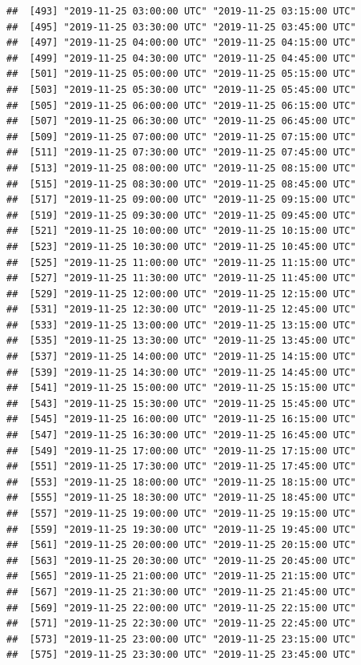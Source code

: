 \documentclass{article}\usepackage[]{graphicx}\usepackage[]{color}
\makeatletter
\newenvironment{kframe}{%
 \def\at@end@of@kframe{}%
 \ifinner\ifhmode%
  \def\at@end@of@kframe{\end{minipage}}%
  \begin{minipage}{\columnwidth}%
 \fi\fi%
 \def\FrameCommand##1{\hskip\@totalleftmargin \hskip-\fboxsep
 \colorbox{shadecolor}{##1}\hskip-\fboxsep
     \hskip-\linewidth \hskip-\@totalleftmargin \hskip\columnwidth}%
 \MakeFramed {\advance\hsize-\width
   \@totalleftmargin\z@ \linewidth\hsize
   \@setminipage}}%
 {\par\unskip\endMakeFramed%
 \at@end@of@kframe}
\newenvironment{knitrout}{}{} %
\makeatother
\begin{document}
\begin{knitrout}
\begin{kframe}
\begin{verbatim}
##  [493] "2019-11-25 03:00:00 UTC" "2019-11-25 03:15:00 UTC"
##  [495] "2019-11-25 03:30:00 UTC" "2019-11-25 03:45:00 UTC"
##  [497] "2019-11-25 04:00:00 UTC" "2019-11-25 04:15:00 UTC"
##  [499] "2019-11-25 04:30:00 UTC" "2019-11-25 04:45:00 UTC"
##  [501] "2019-11-25 05:00:00 UTC" "2019-11-25 05:15:00 UTC"
##  [503] "2019-11-25 05:30:00 UTC" "2019-11-25 05:45:00 UTC"
##  [505] "2019-11-25 06:00:00 UTC" "2019-11-25 06:15:00 UTC"
##  [507] "2019-11-25 06:30:00 UTC" "2019-11-25 06:45:00 UTC"
##  [509] "2019-11-25 07:00:00 UTC" "2019-11-25 07:15:00 UTC"
##  [511] "2019-11-25 07:30:00 UTC" "2019-11-25 07:45:00 UTC"
##  [513] "2019-11-25 08:00:00 UTC" "2019-11-25 08:15:00 UTC"
##  [515] "2019-11-25 08:30:00 UTC" "2019-11-25 08:45:00 UTC"
##  [517] "2019-11-25 09:00:00 UTC" "2019-11-25 09:15:00 UTC"
##  [519] "2019-11-25 09:30:00 UTC" "2019-11-25 09:45:00 UTC"
##  [521] "2019-11-25 10:00:00 UTC" "2019-11-25 10:15:00 UTC"
##  [523] "2019-11-25 10:30:00 UTC" "2019-11-25 10:45:00 UTC"
##  [525] "2019-11-25 11:00:00 UTC" "2019-11-25 11:15:00 UTC"
##  [527] "2019-11-25 11:30:00 UTC" "2019-11-25 11:45:00 UTC"
##  [529] "2019-11-25 12:00:00 UTC" "2019-11-25 12:15:00 UTC"
##  [531] "2019-11-25 12:30:00 UTC" "2019-11-25 12:45:00 UTC"
##  [533] "2019-11-25 13:00:00 UTC" "2019-11-25 13:15:00 UTC"
##  [535] "2019-11-25 13:30:00 UTC" "2019-11-25 13:45:00 UTC"
##  [537] "2019-11-25 14:00:00 UTC" "2019-11-25 14:15:00 UTC"
##  [539] "2019-11-25 14:30:00 UTC" "2019-11-25 14:45:00 UTC"
##  [541] "2019-11-25 15:00:00 UTC" "2019-11-25 15:15:00 UTC"
##  [543] "2019-11-25 15:30:00 UTC" "2019-11-25 15:45:00 UTC"
##  [545] "2019-11-25 16:00:00 UTC" "2019-11-25 16:15:00 UTC"
##  [547] "2019-11-25 16:30:00 UTC" "2019-11-25 16:45:00 UTC"
##  [549] "2019-11-25 17:00:00 UTC" "2019-11-25 17:15:00 UTC"
##  [551] "2019-11-25 17:30:00 UTC" "2019-11-25 17:45:00 UTC"
##  [553] "2019-11-25 18:00:00 UTC" "2019-11-25 18:15:00 UTC"
##  [555] "2019-11-25 18:30:00 UTC" "2019-11-25 18:45:00 UTC"
##  [557] "2019-11-25 19:00:00 UTC" "2019-11-25 19:15:00 UTC"
##  [559] "2019-11-25 19:30:00 UTC" "2019-11-25 19:45:00 UTC"
##  [561] "2019-11-25 20:00:00 UTC" "2019-11-25 20:15:00 UTC"
##  [563] "2019-11-25 20:30:00 UTC" "2019-11-25 20:45:00 UTC"
##  [565] "2019-11-25 21:00:00 UTC" "2019-11-25 21:15:00 UTC"
##  [567] "2019-11-25 21:30:00 UTC" "2019-11-25 21:45:00 UTC"
##  [569] "2019-11-25 22:00:00 UTC" "2019-11-25 22:15:00 UTC"
##  [571] "2019-11-25 22:30:00 UTC" "2019-11-25 22:45:00 UTC"
##  [573] "2019-11-25 23:00:00 UTC" "2019-11-25 23:15:00 UTC"
##  [575] "2019-11-25 23:30:00 UTC" "2019-11-25 23:45:00 UTC"

\end{verbatim}
\end{kframe}
\end{knitrout}
\end{document}
